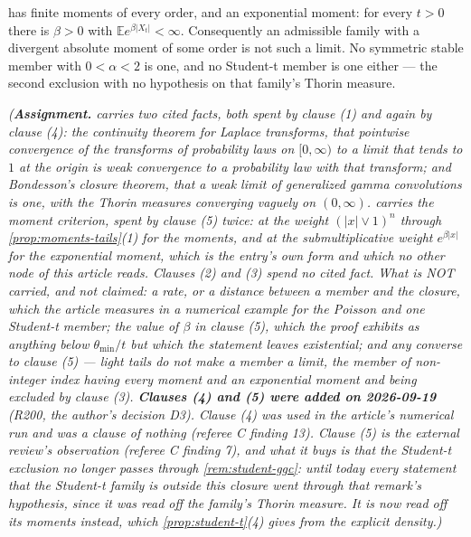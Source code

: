\begin{proposition}
\begin{enumerate}
has finite moments of every order, and an exponential moment: for every $t > 0$ there is
$\beta > 0$ with $\mathbb{E}e^{\beta|X_t|} < \infty$. Consequently an admissible family with a
divergent absolute moment of some order is not such a limit. No symmetric stable member with
$0 < \alpha < 2$ is one, and no Student-t member is one either --- the second exclusion with no
hypothesis on that family's Thorin measure.
\end{enumerate}
\statusA\quad{}\quad{}\quad\emph{(\textbf{Assignment.}  carries
two cited facts,
both spent by clause (1) and again by clause (4): the continuity theorem for Laplace transforms,
that pointwise
convergence of the transforms of probability laws on $[0,\infty)$ to a limit that tends to $1$
at the origin is weak convergence to a probability law with that transform; and Bondesson's
closure theorem, that a weak limit of generalized gamma convolutions is one, with the Thorin
measures converging vaguely on $(0,\infty)$.  carries the moment criterion, spent by
clause (5) twice: at the weight $(|x| \vee 1)^n$ through \ref{prop:moments-tails}(1) for the
moments, and at the submultiplicative weight $e^{\beta|x|}$ for the exponential moment, which is
the entry's own form and which no other node of this article reads. Clauses (2) and (3) spend no
cited fact. What is
NOT carried, and not claimed: a rate, or a distance between a member and the closure, which the
article measures in a numerical example for the Poisson and one Student-t member; the value of
$\beta$ in clause (5), which the proof exhibits as anything below $\theta_{\min}/t$ but which the
statement leaves existential; and any converse to clause (5) --- light tails do not make a member
a limit, the \Matern{} member of non-integer index having every moment and an exponential moment
and being excluded by clause (3).
\textbf{Clauses (4) and (5) were added on 2026-09-19} (R200, the author's decision D3). Clause (4)
was used in the article's numerical run and was a clause of nothing (referee C finding 13). Clause
(5) is the external review's observation (referee C finding 7), and what it buys is that the
Student-t exclusion no longer passes through \ref{rem:student-ggc}: until today every statement
that the Student-t family is outside this closure went through that remark's hypothesis, since it
was read off the family's Thorin measure. It is now read off its moments instead, which
\ref{prop:student-t}(4) gives from the explicit density.)}
\end{proposition}


